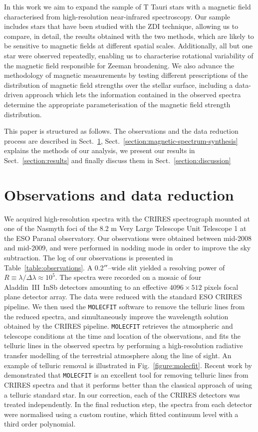 \documentclass{aa}
\begin{document}
In this work we aim to expand the sample of T Tauri stars with a magnetic field characterised from high-resolution near-infrared spectroscopy. Our sample includes stars that have been studied with the ZDI technique, allowing us to compare, in detail, the results obtained with the two methods, which are likely to be sensitive to magnetic fields at different spatial scales. Additionally, all but one star were observed repeatedly, enabling us to characterise rotational variability of the magnetic field responsible for Zeeman broadening. We also advance the methodology of magnetic measurements by testing different prescriptions of the distribution of magnetic field strengths over the stellar surface, including a data-driven approach which lets the information contained in the observed spectra determine the appropriate parameterisation of the magnetic field strength distribution.

This paper is structured as follows. The observations and the data reduction process are described in Sect.~\ref{section:observations}, Sect.~\ref{section:magnetic-spectrum-synthesis} explains the methods of our analysis, we present our results in Sect.~\ref{section:results} and finally discuss them in Sect.~\ref{section:discussion}

\section{Observations and data reduction}
\label{section:observations}
We acquired high-resolution spectra with the CRIRES spectrograph \citep{2004SPIE.5492.1218K} mounted at one of the Nasmyth foci of the 8.2 m Very Large Telescope Unit Telescope 1 at the ESO Paranal observatory. Our observations were obtained between mid-2008 and mid-2009, and were performed in nodding mode in order to improve the sky subtraction. The log of our observations is presented in Table~\ref{table:observations}. A 0.2$^{\prime\prime}$--wide slit yielded a resolving power of $ R \equiv \lambda / \Delta \lambda \approx 10^5$. The spectra were recorded on a mosaic of four Aladdin~III~InSb detectors amounting to an effective $4096 \times 512$ pixels focal plane detector array. The data were reduced with the standard ESO CRIRES pipeline. We then used the {\tt MOLECFIT} software \citep{2015A&A...576A..77S} to remove the telluric lines from the reduced spectra, and simultaneously improve the wavelength solution obtained by the CRIRES pipeline. {\tt MOLECFIT} retrieves the atmospheric and telescope conditions at the time and location of the observations, and fits the telluric lines in the observed spectra by performing a high-resolution radiative transfer modelling of the terrestrial atmosphere along the line of sight. An example of telluric removal is illustrated in Fig.~\ref{figure:molecfit}. Recent work by \citet{2019A&A...621A..79U} demonstrated that {\tt MOLECFIT} is an excellent tool for removing telluric lines from CRIRES spectra and that it performs better than the classical approach of using a telluric standard star. In our correction, each of the CRIRES detectors was treated independently. In the final reduction step, the spectra from each detector were normalised using a custom routine, which fitted continuum level with a third order polynomial.
\end{document}
